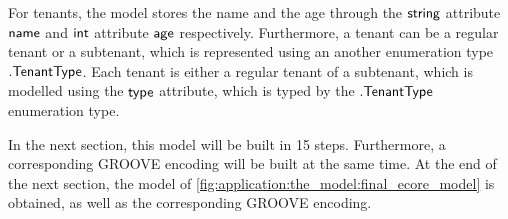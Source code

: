 For tenants, the model stores the name and the age through the $\mathsf{string}$ attribute $\mathsf{name}$ and $\mathsf{int}$ attribute $\mathsf{age}$ respectively. Furthermore, a tenant can be a regular tenant or a subtenant, which is represented using an another enumeration type $.\mathsf{TenantType}$. Each tenant is either a regular tenant of a subtenant, which is modelled using the $\mathsf{type}$ attribute, which is typed by the $.\mathsf{TenantType}$ enumeration type.

In the next section, this model will be built in 15 steps. Furthermore, a corresponding GROOVE encoding will be built at the same time. At the end of the next section, the model of \cref{fig:application:the_model:final_ecore_model} is obtained, as well as the corresponding GROOVE encoding.